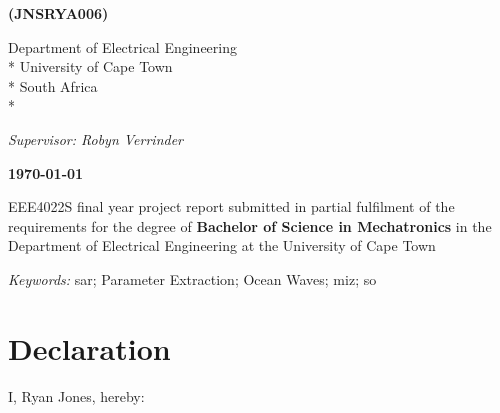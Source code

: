 \documentclass[a4paper, 11pt, oneside, openright, parskip=full]{book}
\newcommand{\auth}{Ryan Jones}							%
\newcommand{\studentnumber}{JNSRYA006}					%
\newcommand{\dept}{Department of Electrical Engineering}%
\newcommand{\uni}{University of Cape Town}				%
\newcommand{\city}{Rondebosch, Cape Town}				%
\newcommand{\country}{South Africa}						%
\newcommand{\ebedegree}{Bachelor of Science in Mechatronics} %
\newcommand{\supervisor}{Robyn Verrinder}					        %
\newcommand{\course}{EEE4022S}					        %
\newcommand{\key}{\acl{sar}; Parameter Extraction; Ocean Waves; \acl{miz}; \acl{so}}					   %
\begin{document}
\begin{titlepage}
	\begin{normalsize}
	    \textbf{(\studentnumber)}
	\end{normalsize}
	\vskip 25pt	
	\begin{normalsize}				
		\dept\\*
		\uni\\*
		\country\\*
		\vskip 25pt	
	\end{normalsize}
	\begin{large}					
		\textit{Supervisor:	\supervisor\\}
		\vskip 25pt	
	\end{large}
	\begin{Large}					
		\textbf{\mydate\today}
		\vskip 25pt	
	\end{Large}
\course{} final year project report submitted in partial fulfilment of the requirements for the degree of \textbf{\ebedegree{}} in the \dept{} at the \uni{}
		\vskip 25pt		
	\begin{normalsize}				
		\textit{Keywords:}
		\key			
	\end{normalsize}	
\end{titlepage}

\frontmatter
\chapter{Declaration}				
\label{ch:decl}
I, \auth,  hereby:
\end{document}
